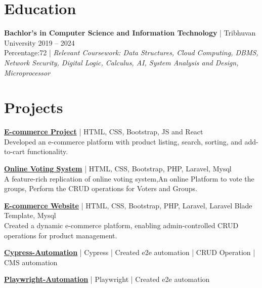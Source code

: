 \documentclass[a4paper,10pt]{article}
\begin{document}

\section*{Education}
\textbf{Bachlor's in Computer Science and Information Technology} | Tribhuvan University \hfill 2019 -- 2024 \\
Percentage:72 | \textit{Relevant Coursework: Data Structures, Cloud Computing, DBMS, Network Security, Digital Logic, Calculus, AI, System Analysis and Design, Microprocessor}

\section*{Projects}
\textbf{\href{https://bhimassignment.netlify.app/}{E-commerce Project}} | HTML, CSS, Bootstrap, JS and React \\  
Developed an e-commerce platform with product listing, search, sorting, and add-to-cart functionality.

\noindent\textbf{\href{https://github.com/bhimpd/Online-Voting-System}{Online Voting System}} | HTML, CSS, Bootstrap, PHP, Laravel, Mysql \\  
A feature-rich replication of online voting system,An online Platform to vote the groups, Perform the CRUD operations for Voters and Groups.

\noindent\textbf{\href{https://github.com/bhimpd/laravel_2ndecommerce}{E-commerce Website}} | HTML, CSS, Bootstrap, PHP, Laravel, Laravel Blade Template,  Mysql \\  
Created a dynamic e-commerce platform, enabling admin-controlled CRUD operations for product management.

\noindent\textbf{\href{https://github.com/bhimpd/toolfix_automation}{Cypress-Automation}} | Cypress |  Created e2e automation | CRUD Operation | CMS automation

\noindent\textbf{\href{https://github.com/bhimpd/playwright_automation}{Playwright-Automation}} | Playwright |  Created e2e automation

\end{document}
